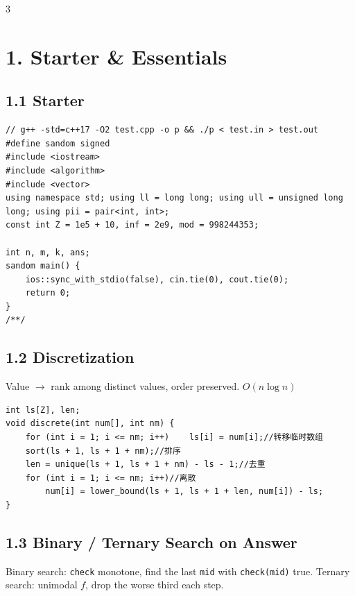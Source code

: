 \documentclass[8pt]{extarticle}
\begin{document}
\begin{multicols*}{3}
\tableofcontents
\section*{1. Starter \& Essentials}

\subsection*{1.1 Starter}

\begin{lstlisting}
// g++ -std=c++17 -O2 test.cpp -o p && ./p < test.in > test.out
#define sandom signed
#include <iostream>
#include <algorithm>
#include <vector>
using namespace std; using ll = long long; using ull = unsigned long long; using pii = pair<int, int>;
const int Z = 1e5 + 10, inf = 2e9, mod = 998244353;

int n, m, k, ans;
sandom main() {
    ios::sync_with_stdio(false), cin.tie(0), cout.tie(0);
    return 0;
}
/**/
\end{lstlisting}

\subsection*{1.2 Discretization}

Value $\to$ rank among distinct values, order preserved. $O(n \log n)$


\begin{lstlisting}
int ls[Z], len;
void discrete(int num[], int nm) {
    for (int i = 1; i <= nm; i++)    ls[i] = num[i];//转移临时数组
    sort(ls + 1, ls + 1 + nm);//排序
    len = unique(ls + 1, ls + 1 + nm) - ls - 1;//去重
    for (int i = 1; i <= nm; i++)//离散
        num[i] = lower_bound(ls + 1, ls + 1 + len, num[i]) - ls;
}
\end{lstlisting}

\subsection*{1.3 Binary / Ternary Search on Answer}

Binary search: \texttt{check} monotone, find the last \texttt{mid} with \texttt{check(mid)} true. Ternary search: unimodal $f$, drop the worse third each step.



\end{multicols*}
\end{document}
